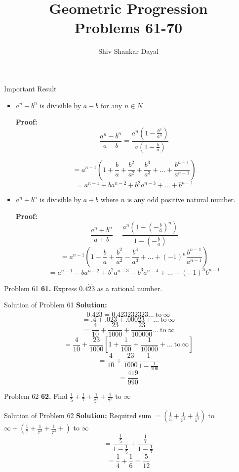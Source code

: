 \documentclass[aspectratio=1610,8pt]{beamer}
\title{Geometric Progression\\Problems 61-70}
\author[Shiv Shankar Dayal]{Shiv Shankar Dayal}
\begin{document}
\begin{frame}
       \titlepage
\end{frame}
\begin{frame}{Important Result}
  \begin{itemize}
  \item $a^n - b^n$ is divisible by $a - b$ for any $n \in N$

    \textbf{Proof:} $$\frac{a^n - b^n}{a - b} = \frac{a^n\left(1 - \frac{b^n}{a^n}\right)}{a\left(1 - \frac{b}{a}\right)}$$

    $$= a^{n - 1}\left(1 + \frac{b}{a} + \frac{b^2}{a^2} + \frac{b^3}{a^3} + \ldots + \frac{b^{n - 1}}{a^{n - 1}}\right)$$
    $$= a^{n - 1} + ba^{n - 2} + b^2a^{n - 3} + \ldots + b^{n - 1}$$
  \item $a^n + b^n$ is divisible by $a + b$ where $n$ is any odd positive natural number.

    \textbf{Proof:} $$\frac{a^n + b^n}{a + b} = \frac{a^n\left(1 - \left(-\frac{b}{a}\right)^n\right)}{1 - \left(-\frac{b}{a}\right)}$$
    $$= a^{n - 1}\left(1 - \frac{b}{a} + \frac{b^2}{a^2} - \frac{b^3}{a^3} + \ldots + (-1)^n\frac{b^{n - 1}}{a^{n - 1}}\right)$$
    $$= a^{n - 1} - ba^{n - 2} + b^2a^{n - 3} - b^3a^{n - 4} + \ldots + (-1)^nb^{n - 1}$$
  \end{itemize}
\end{frame}
\begin{frame}{Problem 61}
  \textbf{61.} Express $0.4\dot{2}\dot{3}$ as a rational number.
\end{frame}
\begin{frame}{Solution of Problem 61}
  \textbf{Solution:} $$0.4\dot{2}\dot{3} = 0.423232323 \ldots~\text{to}~\infty$$
  $$= .4 + .023 + .00023 + \ldots~\text{to}~\infty$$
  $$= \frac{4}{10}+ \frac{23}{1000} + \frac{23}{100000} \ldots~\text{to}~\infty$$
  $$= \frac{4}{10} + \frac{23}{1000}\left[1 + \frac{1}{100} + \frac{1}{10000}+ \ldots~\text{to}~\infty\right]$$
  $$= \frac{4}{10} + \frac{23}{1000}\frac{1}{1 - \frac{1}{100}}$$
  $$= \frac{419}{990}$$
\end{frame}
\begin{frame}{Problem 62}
  \textbf{62.} Find $\frac{1}{5} + \frac{1}{7} + \frac{1}{5^2} + \frac{1}{7^2}$ to $\infty$
\end{frame}
\begin{frame}{Solution of Problem 62}
  \textbf{Solution:} Required sum $= \left(\frac{1}{5} + \frac{1}{5^2} + \frac{1}{5^3}\right)$ to $\infty + \left(\frac{1}{7} +
  \frac{1}{7^2} + \frac{1}{7^3} + \right)$ to $\infty$
  $$= \frac{\frac{1}{5}}{1 - \frac{1}{5}} + \frac{\frac{1}{7}}{1 - \frac{1}{7}}$$
  $$= \frac{1}{4} + \frac{1}{6} = \frac{5}{12}$$
\end{frame}
\end{document}
